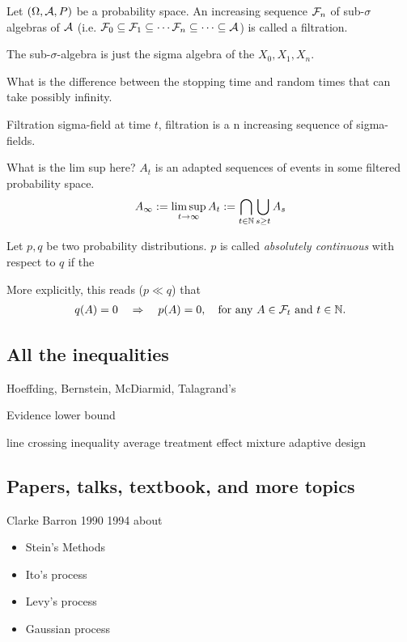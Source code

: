 \begin{define}[Filtration]
	Let $(\Omega, \mathcal{A}, P)$ be a probability space. An increasing sequence $\mathcal{F}_n$ of sub-$\sigma$ algebras of $\mathcal{A}$
	(i.e. $\mathcal{F}_0 \subseteq \mathcal{F}_1 \subseteq \cdots \mathcal{F}_n \subseteq \cdots \subseteq \mathcal{A}$) is called a filtration.
\end{define}

The sub-$\sigma$-algebra is just the sigma algebra of the $X_0, X_1, X_n$.

What is the difference between the stopping time and random times that can take possibly infinity.

Filtration sigma-field at time $t$, filtration is a n increasing sequence of sigma-fields.

What is the lim sup here? $A_t$ is an adapted sequences of events in some filtered probability space.
$$
	A_\infty := \limsup_{t\to \infty} A_t := \bigcap_{t\in\mathbb{N}}\bigcup_{s\geq t}A_s
$$

\begin{define}
	Let $p, q$ be two probability distributions. $p$ is called \emph{absolutely continuous} with respect to $q$ if the

	More explicitly, this reads ($p \ll q$) that
	\begin{align*}
		q(A) = 0 \quad \Rightarrow \quad p(A) = 0,  \quad \text{for any } A \in \Fc_t \text{ and } t \in \Nf.
	\end{align*}
\end{define}

\subsection{All the inequalities}

Hoeffding, Bernstein, McDiarmid, Talagrand's

Evidence lower bound

line crossing inequality
average treatment effect
mixture adaptive design

\subsection{Papers, talks, textbook, and more topics}

Clarke Barron 1990 1994 about
\begin{itemize}
	\item Stein's Methods
	\item Ito's process
	\item Levy's process
	\item Gaussian process
\end{itemize}

